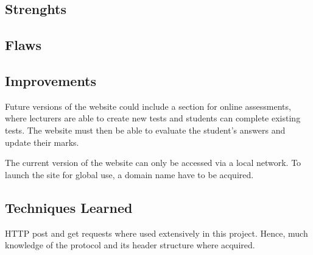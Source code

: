 \documentclass[a4paper,12pt]{article}
\numberwithin{equation}{section} %
\numberwithin{figure}{section}
\begin{document}
\subsection{Strenghts}

\subsection{Flaws}

\subsection{Improvements}
Future versions of the website could include a section for online assessments, where lecturers are able to create new tests and students can complete existing tests. The website must then be able to evaluate the student's answers and update their marks.

The current version of the website can only be accessed via a local network. To launch the site for global use, a domain name have to be acquired.

\subsection{Techniques Learned}
HTTP post and get requests where used extensively in this project. Hence, much knowledge of the protocol and its header structure where acquired. 


\nocite{*} %

\end{document}
